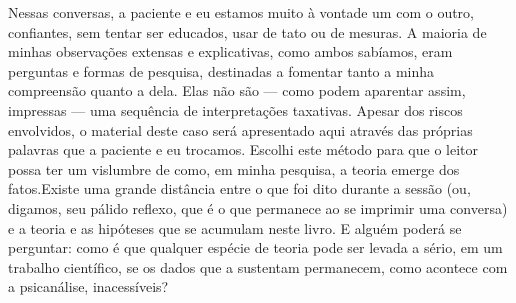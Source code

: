 Nessas conversas, a paciente e eu estamos muito à vontade um com o
outro, confiantes, sem tentar ser educados, usar de tato ou de mesuras.
A maioria de minhas observações extensas e explicativas, como ambos
sabíamos, eram perguntas e formas de pesquisa, destinadas a fomentar
tanto a minha compreensão quanto a dela. Elas não são --- como podem
aparentar assim, impressas --- uma sequência de interpretações
taxativas. Apesar dos riscos envolvidos, o material deste caso será
apresentado aqui através das próprias palavras que a paciente e eu
trocamos. Escolhi este método para que o leitor possa ter um vislumbre
de como, em minha pesquisa, a teoria emerge dos fatos.\idxcrime[|)] Existe uma
grande distância entre o que foi dito durante a sessão (ou, digamos,
seu pálido reflexo, que é o que permanece ao se imprimir uma conversa)
e a teoria e as hipóteses que se acumulam neste livro. E alguém poderá
se perguntar: como é que qualquer espécie de teoria pode ser levada a
sério, em um trabalho científico, se os dados que a sustentam
permanecem, como acontece com a psicanálise, inacessíveis?


\bigskip

